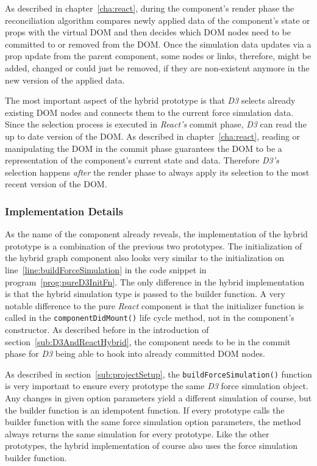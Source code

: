 As described in chapter~\ref{cha:react}, during the component's render phase the reconciliation algorithm compares newly applied data of the component's state or props with the virtual DOM and then decides which DOM nodes need to be committed to or removed from the DOM. Once the simulation data updates via a prop update from the parent component, some nodes or links, therefore, might be added, changed or could just be removed, if they are non-existent anymore in the new version of the applied data.

The most important aspect of the hybrid prototype is that \emph{D3} selects already existing DOM nodes and connects them to the current force simulation data. Since the selection process is executed in \emph{React's} commit phase, \emph{D3} can read the up to date version of the DOM. As described in chapter~\ref{cha:react}, reading or manipulating the DOM in the commit phase guarantees the DOM to be a representation of the component's current state and data. Therefore \emph{D3's} selection happens \emph{after} the render phase to always apply its selection to the most recent version of the DOM.

\subsubsection{Implementation Details}

As the name of the component already reveals, the implementation of the hybrid prototype is a combination of the previous two prototypes. The initialization of the hybrid graph component also looks very similar to the initialization on line~\ref{line:buildForceSimulation} in the code snippet in program~\ref{prog:pureD3InitFn}. The only difference in the hybrid implementation is that the hybrid simulation type is passed to the builder function. A very notable difference to the pure \emph{React} component is that the initializer function is called in the \texttt{componentDidMount()} life cycle method, not in the component's constructor. As described before in the introduction of section~\ref{sub:D3AndReactHybrid}, the component needs to be in the commit phase for \emph{D3} being able to hook into already committed DOM nodes.

As described in section~\ref{sub:projectSetup}, the \texttt{buildForceSimulation()} function is very important to ensure every prototype the same \emph{D3} force simulation object. Any changes in given option parameters yield a different simulation of course, but the builder function is an idempotent function. If every prototype calls the builder function with the same force simulation option parameters, the method always returns the same simulation for every prototype. Like the other prototypes, the hybrid implementation of course also uses the force simulation builder function.

